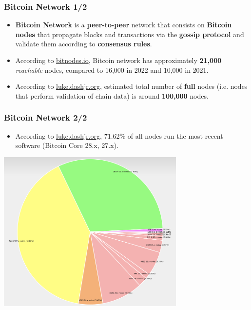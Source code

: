 \documentclass{beamer}
\begin{document}
\begin{frame}
  \frametitle{Bitcoin Network 1/2}
  \begin{itemize}
  \item \textbf{Bitcoin Network} is a \textbf{peer-to-peer} network that
    consists on \textbf{Bitcoin nodes} that propagate blocks and transactions
    via the \textbf{gossip protocol} and validate them according to
    \textbf{consensus rules}.
  \item According to \href{https://bitnodes.io}{bitnodes.io}, Bitcoin network
    has approximately \textbf{21,000} \textit{reachable} nodes, compared to
    16,000 in 2022 and 10,000 in 2021.
  \item According to \href{https://luke.dashjr.org}{luke.dashjr.org}, estimated
    total number of \textbf{full} nodes (i.e. nodes that perform validation of
    chain data) is around \textbf{100,000} nodes.
  \end{itemize}
\end{frame}

\begin{frame}
  \frametitle{Bitcoin Network 2/2}
  \begin{itemize}
  \item According to \href{https://luke.dashjr.org}{luke.dashjr.org}, 71.62\% of
    all nodes run the most recent software (Bitcoin Core 28.x, 27.x).
  \end{itemize}
  \begin{center}
    \includegraphics[width=0.7\textwidth]{nodes}
  \end{center}
\end{frame}
\end{document}
